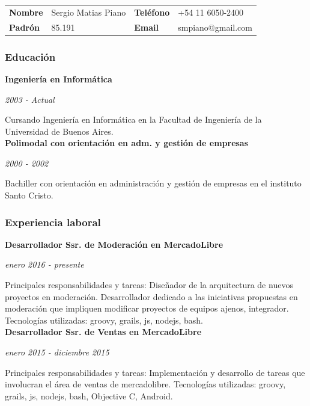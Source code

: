 \documentclass[a4paper,11pt]{article}
\begin{document}
\noindent \begin{tabular}{l l l l}
  \textbf{Nombre} & Sergio Matias Piano  & \textbf{Teléfono} & +54 11 6050-2400\\
  \textbf{Padrón} & 85.191               & \textbf{Email}    & smpiano@gmail.com \\
\end{tabular}

\subsubsection{Educación}

\noindent \textbf{Ingeniería en Informática}

\noindent\emph{2003 - Actual}

\noindent Cursando Ingeniería en Informática en la Facultad de Ingeniería de la
Universidad de Buenos Aires. \\

\noindent \textbf{Polimodal con orientación en adm. y gestión de empresas}

\noindent\emph{2000 - 2002}

\noindent Bachiller con orientación en administración y gestión de empresas en
el instituto Santo Cristo.

\subsubsection{Experiencia laboral}

\noindent \textbf{Desarrollador Ssr. de Moderación en MercadoLibre}

\noindent \emph{enero 2016 - presente}

\noindent Principales responsabilidades y tareas: Diseñador de la arquitectura
de nuevos proyectos en moderación. Desarrollador dedicado a las iniciativas
propuestas en moderación que impliquen modificar proyectos de equipos ajenos,
integrador. Tecnologías utilizadas: groovy, grails, js, nodejs, bash. \\

\noindent \textbf{Desarrollador Ssr. de Ventas en MercadoLibre}

\noindent \emph{enero 2015 - diciembre 2015}

\noindent Principales responsabilidades y tareas: Implementación y desarrollo
de tareas que involucran el área de ventas de mercadolibre.  Tecnologías
utilizadas: groovy, grails, js, nodejs, bash, Objective C, Android. \\
\end{document}
